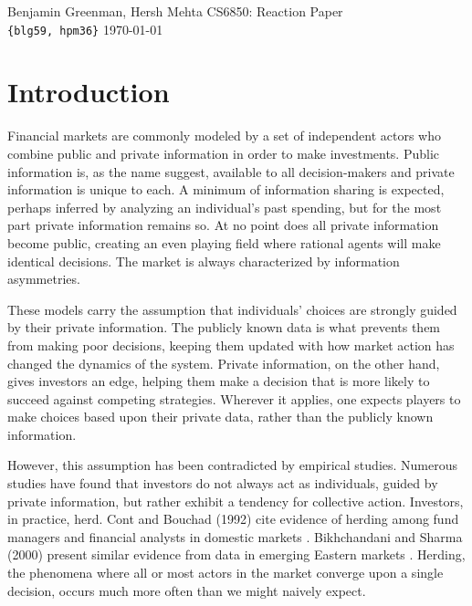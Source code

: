 \documentclass{article}
\renewcommand\maketitle{
\begin{flushleft}
{%
\large{%
Benjamin Greenman,
Hersh Mehta
\hfill
CS6850: Reaction Paper
\\\texttt{\{blg59, hpm36\}} \hfill \today
}}\\
\hrulefill
\end{flushleft}
}
\begin{document}
\maketitle

\section{Introduction}
Financial markets are commonly modeled by a set of independent actors who combine public and private information in order to make investments.
Public information is, as the name suggest, available to all decision-makers and private information is unique to each.
A minimum of information sharing is expected, perhaps inferred by analyzing an individual's past spending, but for the most part private information remains so.
At no point does all private information become public, creating an even playing field where rational agents will make identical decisions.
The market is always characterized by information asymmetries.

These models carry the assumption that individuals' choices are strongly guided by their private information.
The publicly known data is what prevents them from making poor decisions, keeping them updated with how market action has changed the dynamics of the system.
Private information, on the other hand, gives investors an edge, helping them make a decision that is more likely to succeed against competing strategies.
Wherever it applies, one expects players to make choices based upon their private data, rather than the publicly known information.

However, this assumption has been contradicted by empirical studies. 
Numerous studies have found that investors do not always act as individuals, guided by private information, but rather exhibit a tendency for collective action.
Investors, in practice, herd.
Cont and Bouchad (1992) cite evidence of herding among fund managers and financial analysts in domestic markets \cite[174]{cont}.
Bikhchandani and Sharma (2000) present similar evidence from data in emerging Eastern markets \cite{bikhchandani}.
Herding, the phenomena where all or most actors in the market converge upon a single decision, occurs much more often than we might naively expect.
\end{document}
